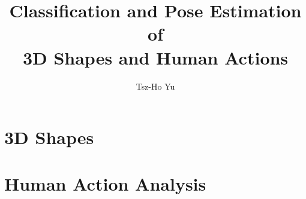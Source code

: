 \documentclass[a4paper, 12pt]{class/thyuthesis}
\title{Classification and Pose Estimation of \\3D Shapes and Human Actions}
\author{Tsz-Ho Yu}
\begin{document}
\maketitle

\frontmatter
{}




\begin{KeepFromToc}
\tableofcontents \newpage
\end{KeepFromToc} 
\listoffigures \newpage
\listoftables


\mainmatter



\part{3D Shapes}





\part{Human Action Analysis}






 

\backmatter
%


\renewcommand{\bibname}{References} 
 
\end{document}
